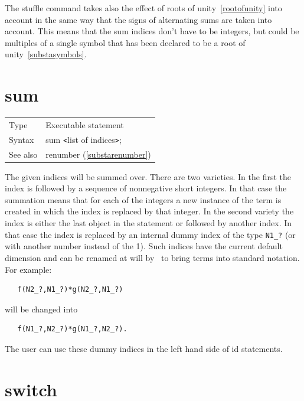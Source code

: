 The stuffle command takes also the effect of roots of 
unity~\ref{rootofunity} into account in the same way 
that the signs of alternating sums are taken into account. This means that 
the sum indices don't have to be integers, but could be multiples of a 
single symbol that has been declared to be a root of 
unity~\ref{substasymbols}.
\vspace{10mm}
%

\section{sum}
\label{substasum}

\noindent \begin{tabular}{ll}
Type & Executable statement\\
Syntax & sum {\tt<}list of indices{\tt>};
\\ See also & renumber (\ref{substarenumber})
\end{tabular}\vspace{4mm}

\noindent The given indices will be summed over. There are two 
varieties. In the first the index is followed by a sequence of nonnegative 
short integers. In that case the summation means that for each of the 
integers a new instance of the term is created in which the index is 
replaced by that integer. In the second variety the index is either the 
last object in the statement or followed by another index. In that case the 
index is replaced by an internal dummy 
index of the type \verb:N1_?: (or with another number 
instead of the 1). Such indices have the current
default dimension and can 
be renamed at will by \FORM\ to bring terms into standard notation. For 
example:
\begin{verbatim}
   f(N2_?,N1_?)*g(N2_?,N1_?)
\end{verbatim}
will be changed into
\begin{verbatim}
   f(N1_?,N2_?)*g(N1_?,N2_?).
\end{verbatim}
The user can use these dummy indices in the left hand side of 
id statements.
\vspace{10mm}

%
\section{switch}
\label{substaswitch}

